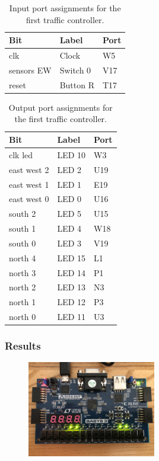 \documentclass[11pt]{article}
\begin{document}
\begin{table}[H]
\begin{center}
\begin{tabular}{| l | l | l |}
	\hline
	Bit & Label & Port \\ \hline
	clk & Clock & W5 \\ \hline
	sensors EW & Switch 0 & V17 \\ \hline
	reset & Button R & T17 \\ \hline
\end{tabular}
\caption{\label{tab:part1_input_Ports}Input port assignments for  the first traffic controller.}
\end{center}
\end{table}

\begin{table}[H]
\begin{center}
\begin{tabular}{| l | l | l |}
	\hline
	Bit & Label & Port \\ \hline
	clk led & LED 10 & W3 \\ \hline
	east west 2 & LED 2 & U19 \\ \hline
	east west 1 & LED 1 & E19 \\ \hline
	east west 0 & LED 0 & U16 \\ \hline
	south 2 & LED 5 & U15 \\ \hline
	south 1 & LED 4 & W18 \\ \hline
	south 0 & LED 3 & V19 \\ \hline
	north 4 & LED 15 & L1 \\ \hline
	north 3 & LED 14 & P1 \\ \hline
	north 2 & LED 13 & N3 \\ \hline
	north 1 & LED 12 & P3 \\ \hline
	north 0 & LED 11 & U3 \\ \hline
\end{tabular}
\caption{\label{tab:part1_output_Ports}Output port assignments for the first traffic controller.}
\end{center}
\end{table}

\subsubsection{Results}


\begin{figure}[H]
\begin{center}
	\includegraphics[width=0.5\textwidth]{./images/Part1/l9p1img1.jpg}
	\caption{\label{fig:part1_img1}}
\end{center}
\end{figure}
\end{document}
